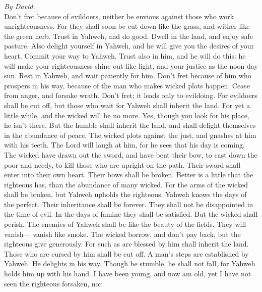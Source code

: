 \emph{By David.}\\
 Don't fret because of evildoers, neither be envious
against those who work unrighteousness.  For they shall
soon be cut down like the grass, and wither like the green herb.
 Trust in Yahweh, and do good. Dwell in the land, and
enjoy safe pasture.  Also delight yourself in Yahweh, and
he will give you the desires of your heart.  Commit your
way to Yahweh. Trust also in him, and he will do this:  he
will make your righteousness shine out like light, and your justice as
the noon day sun.  Rest in Yahweh, and wait patiently for
him. Don't fret because of him who prospers in his way, because of the
man who makes wicked plots happen.  Cease from anger, and
forsake wrath. Don't fret; it leads only to evildoing. 
For evildoers shall be cut off, but those who wait for Yahweh shall
inherit the land.  For yet a little while, and the wicked
will be no more. Yes, though you look for his place, he isn't there.
 But the humble shall inherit the land, and shall delight
themselves in the abundance of peace.  The wicked plots
against the just, and gnashes at him with his teeth.  The
Lord will laugh at him, for he sees that his day is coming.
 The wicked have drawn out the sword, and have bent their
bow, to cast down the poor and needy, to kill those who are upright on
the path.  Their sword shall enter into their own heart.
Their bows shall be broken.  Better is a little that the
righteous has, than the abundance of many wicked.  For
the arms of the wicked shall be broken, but Yahweh upholds the
righteous.  Yahweh knows the days of the perfect. Their
inheritance shall be forever.  They shall not be
disappointed in the time of evil. In the days of famine they shall be
satisfied.  But the wicked shall perish. The enemies of
Yahweh shall be like the beauty of the fields. They will vanish---
vanish like smoke.  The wicked borrow, and don't pay
back, but the righteous give generously.  For such as are
blessed by him shall inherit the land. Those who are cursed by him shall
be cut off.  A man's steps are established by Yahweh. He
delights in his way.  Though he stumble, he shall not
fall, for Yahweh holds him up with his hand.  I have been
young, and now am old, yet I have not seen the righteous forsaken, nor
